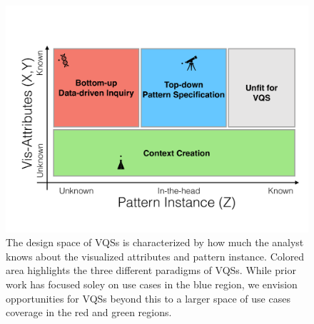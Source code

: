 \begin{figure}[h!]
  \centering
  \includegraphics[width=\linewidth]{figures/2dmodel.pdf}
  \caption{The design space of VQSs is characterized by how much the analyst knows about the visualized attributes and pattern instance. Colored area highlights the three different paradigms of VQSs. While prior work has focused soley on use cases in the blue region, we envision opportunities for VQSs beyond this to a larger space of use cases coverage in the red and green regions.}
  \label{2dmodel}
\end{figure}
